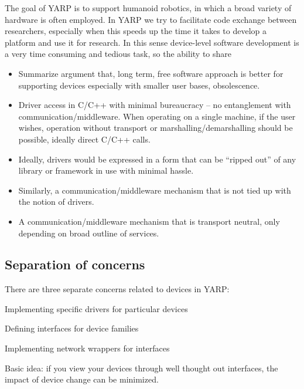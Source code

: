 The goal of YARP is to support humanoid robotics, in which a broad 
variety of hardware is often employed. In YARP we try to facilitate code 
exchange between researchers, especially when this speeds up the time 
it takes to develop a platform and use it for research. In this sense 
device-level software development is a very time consuming and tedious 
task, so the ability to share 



\begin{itemize}

\item Summarize argument that, long term, free software approach 
is better for supporting devices especially with smaller user
bases, obsolescence.


\item Driver access in C/C++ with minimal bureaucracy -- no
entanglement with communication/middleware.  When operating
on a single machine, if the user wishes, operation without
transport or marshalling/demarshalling should be possible, ideally
direct C/C++ calls.

\item Ideally, drivers would be expressed in a form that
can be ``ripped out'' of any library or framework in use
with minimal hassle.

\item Similarly, a communication/middleware mechanism that is 
not tied up with the notion of drivers.

\item A communication/middleware mechanism that is transport
neutral, only depending on broad outline of services.


\end{itemize}




\subsection{Separation of concerns}

There are three separate concerns related to devices in YARP:

Implementing specific drivers for particular devices 

Defining interfaces for device families 

Implementing network wrappers for interfaces

Basic idea: if you view your devices through well thought out
interfaces, the impact of device change can be minimized.






